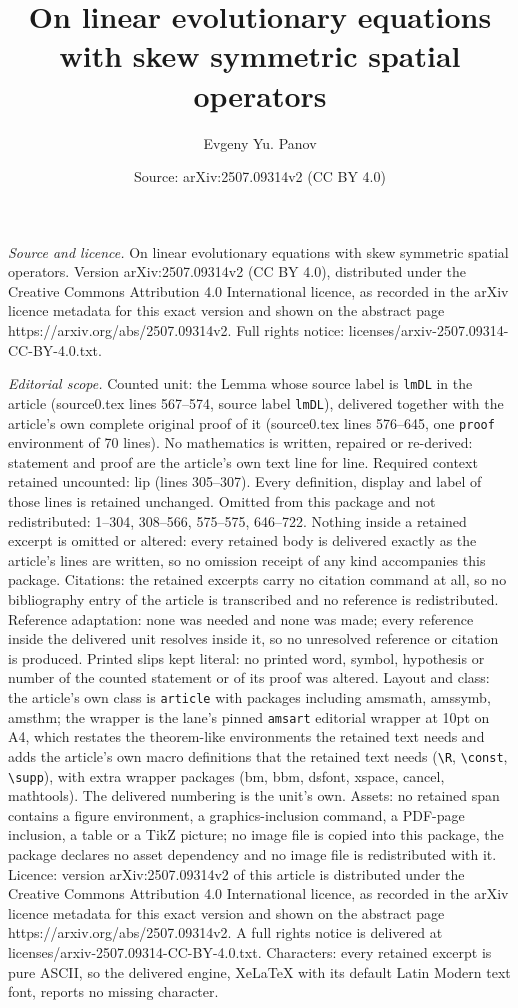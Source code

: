 \documentclass[10pt,a4paper]{amsart}
\title[On linear evolutionary equations with skew symmetric spatial]{On linear evolutionary equations with skew symmetric spatial operators}
\author{Evgeny Yu. Panov}
\date{Source: arXiv:2507.09314v2 (CC BY 4.0)}
\begin{document}
\maketitle

\noindent\emph{Source and licence.} On linear evolutionary equations with skew symmetric spatial operators. Version arXiv:2507.09314v2 (CC BY 4.0), distributed under the Creative Commons Attribution 4.0 International licence, as recorded in the arXiv licence metadata for this exact version and shown on the abstract page https://arxiv.org/abs/2507.09314v2. Full rights notice: licenses/arxiv-2507.09314-CC-BY-4.0.txt.\par\smallskip

\noindent\textit{Editorial scope.} Counted unit: the Lemma whose source label is \texttt{lmDL} in the article (source0.tex lines 567--574, source label \texttt{lmDL}), delivered together with the article's own complete original proof of it (source0.tex lines 576--645, one \texttt{proof} environment of 70 lines). No mathematics is written, repaired or re-derived: statement and proof are the article's own text line for line. Required context retained uncounted: lip (lines 305--307). Every definition, display and label of those lines is retained unchanged. Omitted from this package and not redistributed: 1--304, 308--566, 575--575, 646--722. Nothing inside a retained excerpt is omitted or altered: every retained body is delivered exactly as the article's lines are written, so no omission receipt of any kind accompanies this package. Citations: the retained excerpts carry no citation command at all, so no bibliography entry of the article is transcribed and no reference is redistributed. Reference adaptation: none was needed and none was made; every reference inside the delivered unit resolves inside it, so no unresolved reference or citation is produced. Printed slips kept literal: no printed word, symbol, hypothesis or number of the counted statement or of its proof was altered. Layout and class: the article's own class is \texttt{article} with packages including amsmath, amssymb, amsthm; the wrapper is the lane's pinned \texttt{amsart} editorial wrapper at 10pt on A4, which restates the theorem-like environments the retained text needs and adds the article's own macro definitions that the retained text needs (\texttt{\textbackslash R}, \texttt{\textbackslash const}, \texttt{\textbackslash supp}), with extra wrapper packages (bm, bbm, dsfont, xspace, cancel, mathtools). The delivered numbering is the unit's own. Assets: no retained span contains a figure environment, a graphics-inclusion command, a PDF-page inclusion, a table or a TikZ picture; no image file is copied into this package, the package declares no asset dependency and no image file is redistributed with it. Licence: version arXiv:2507.09314v2 of this article is distributed under the Creative Commons Attribution 4.0 International licence, as recorded in the arXiv licence metadata for this exact version and shown on the abstract page https://arxiv.org/abs/2507.09314v2. A full rights notice is delivered at licenses/arxiv-2507.09314-CC-BY-4.0.txt. Characters: every retained excerpt is pure ASCII, so the delivered engine, XeLaTeX with its default Latin Modern text font, reports no missing character.
\end{document}
